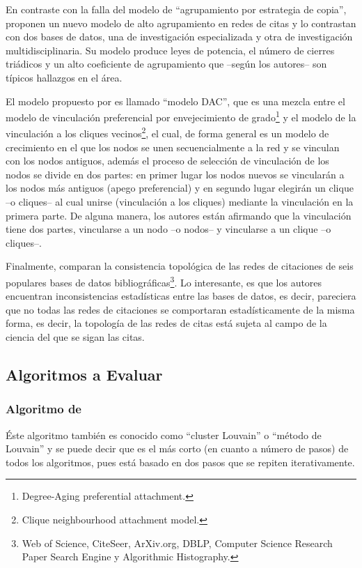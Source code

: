 \documentclass[12pt,letter]{article}
\begin{document}
\vspace{0.5cm}
En contraste con la falla del modelo de ``agrupamiento por estrategia de copia'', \cite{Ren} proponen un nuevo modelo de alto agrupamiento en redes de citas y lo contrastan con dos bases de datos, una de investigación especializada y otra de investigación multidisciplinaria. Su modelo produce leyes de potencia, el número de cierres triádicos y un alto coeficiente de agrupamiento que --según los autores-- son típicos hallazgos en el área.

\vspace{0.5cm}
El modelo propuesto por \cite{Ren} es llamado ``modelo DAC'', que es una mezcla entre el modelo de vinculación preferencial por envejecimiento de grado\footnote{Degree-Aging preferential attachment.} y el modelo de la vinculación a los cliques vecinos\footnote{Clique neighbourhood attachment model.}, el cual, de forma general es un modelo de crecimiento en el que los nodos se unen secuencialmente a la red y se vinculan con los nodos antiguos, además el proceso de selección de vinculación de los nodos se divide en dos partes: en primer lugar los nodos nuevos se vincularán a los nodos más antiguos (apego preferencial) y en segundo lugar elegirán un clique --o cliques-- al cual unirse (vinculación a los cliques) mediante la vinculación en la primera parte. De alguna manera, los autores están afirmando que la vinculación tiene dos partes, vincularse a un nodo --o nodos-- y vincularse a un clique --o cliques--.

\vspace{0.5cm}

Finalmente, \cite{Subelj} comparan la consistencia topológica de las redes de citaciones de seis populares bases de datos bibliográficas\footnote{Web of Science, CiteSeer, ArXiv.org, DBLP, Computer Science Research Paper Search Engine y Algorithmic Histography.}. Lo interesante, es que los autores encuentran inconsistencias estadísticas entre las bases de datos, es decir, pareciera que no todas las redes de citaciones se comportaran estadísticamente de la misma forma, es decir, la topología de las redes de citas está sujeta al campo de la ciencia del que se sigan las citas.


\subsection{Algoritmos a Evaluar} \label{EvAl}


\subsubsection{Algoritmo de \cite{Blondel}}
Éste algoritmo también es conocido como ``cluster Louvain'' o ``método de Louvain'' y se puede decir que es el más corto (en cuanto a número de pasos) de todos los algoritmos, pues está basado en dos pasos que se repiten iterativamente.
\end{document}

